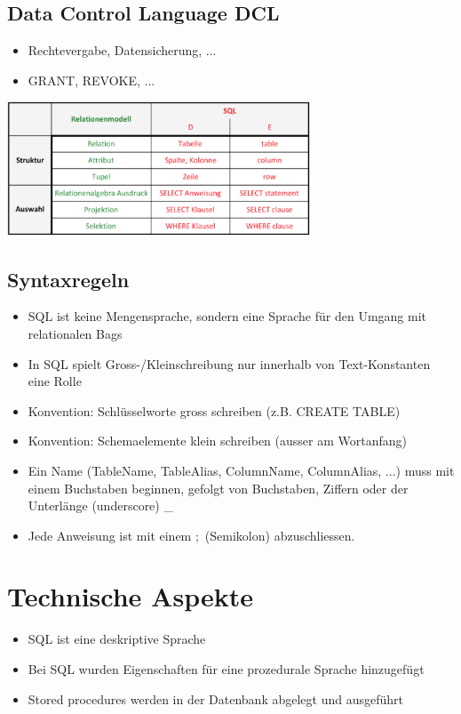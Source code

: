 \documentclass[8pt,a4paper]{scrartcl}
\begin{document}
\begin{multicols*}{3}
			\subsection{Data Control Language DCL}
				\begin{itemize}\itemsep0pt		
					\item Rechtevergabe, Datensicherung, ...
					\item GRANT, REVOKE, ...
				\end{itemize}		
				
			\includegraphics[height=4cm]{img/sql1.png}
			
			\subsection{Syntaxregeln}
				\begin{itemize}\itemsep0pt		
					\item SQL ist keine Mengensprache, sondern eine Sprache für den Umgang mit relationalen Bags
					\item In SQL spielt Gross-/Kleinschreibung nur innerhalb von Text-Konstanten eine Rolle
					\item Konvention: Schlüsselworte gross schreiben (z.B. CREATE TABLE)
					\item Konvention: Schemaelemente klein schreiben (ausser am Wortanfang)
					\item Ein Name (TableName, TableAlias, ColumnName, ColumnAlias, ...) muss mit einem Buchstaben beginnen, gefolgt von Buchstaben, Ziffern oder der Unterlänge (underscore) \_
					\item Jede Anweisung ist mit einem $;$ (Semikolon) abzuschliessen.
				\end{itemize}	

		\section{Technische Aspekte}
			\begin{itemize}\itemsep0pt		
				\item SQL ist eine deskriptive Sprache
				\item Bei SQL wurden Eigenschaften für eine prozedurale Sprache hinzugefügt
				\item Stored procedures werden in der Datenbank abgelegt und ausgeführt
				
			\end{itemize}	
		
		
		
		
	\end{multicols*}
\end{document}

